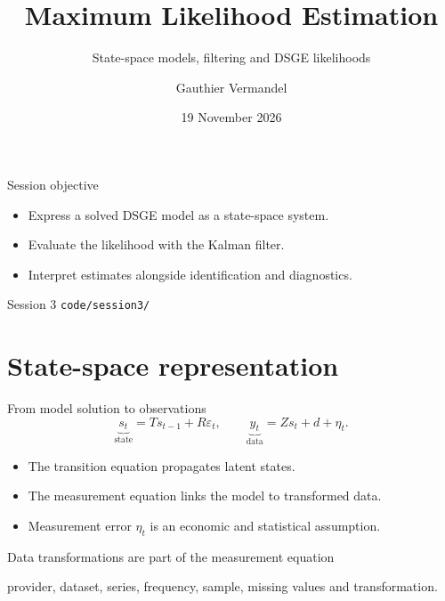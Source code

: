 \documentclass[aspectratio=169,10pt]{beamer}
\title[BTM -- Session 3]{Maximum Likelihood Estimation}
\subtitle{State-space models, filtering and DSGE likelihoods}
\author[Gauthier Vermandel]{Gauthier Vermandel}
\institute{Paris-Dauphine -- PSL}
\date{19 November 2026}
\begin{document}
\begin{frame}\titlepage\end{frame}
\begin{frame}{Session objective}\begin{itemize}\item Express a solved DSGE model as a state-space system.\item Evaluate the likelihood with the Kalman filter.\item Interpret estimates alongside identification and diagnostics.\end{itemize}\vfill{} Session 3 \quad {} \texttt{code/session3/}\end{frame}
\section{State-space representation}
\begin{frame}{From model solution to observations}
\[\underbrace{s_t}_{\text{state}}=T s_{t-1}+R\varepsilon_t,\qquad\underbrace{y_t}_{\text{data}}=Zs_t+d+\eta_t.\]
\begin{itemize}\item The transition equation propagates latent states.\item The measurement equation links the model to transformed data.\item Measurement error \(\eta_t\) is an economic and statistical assumption.\end{itemize}\end{frame}
\begin{frame}{Data transformations are part of the measurement equation}\centering{}
\vfill{} provider, dataset, series, frequency, sample, missing values and transformation.\end{frame}
\end{document}
